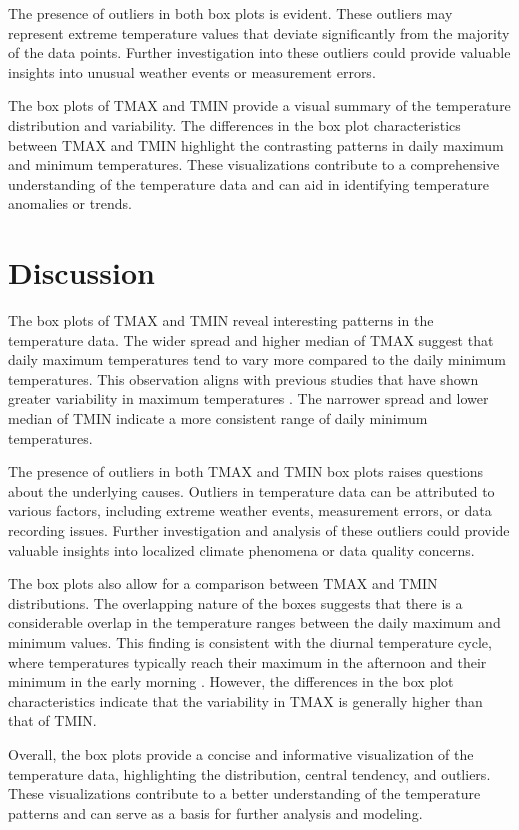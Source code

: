 \documentclass{article}
\begin{document}
The presence of outliers in both box plots is evident. These outliers may represent extreme temperature values that deviate significantly from the majority of the data points. Further investigation into these outliers could provide valuable insights into unusual weather events or measurement errors.

The box plots of TMAX and TMIN provide a visual summary of the temperature distribution and variability. The differences in the box plot characteristics between TMAX and TMIN highlight the contrasting patterns in daily maximum and minimum temperatures. These visualizations contribute to a comprehensive understanding of the temperature data and can aid in identifying temperature anomalies or trends.

\section{Discussion}

The box plots of TMAX and TMIN reveal interesting patterns in the temperature data. The wider spread and higher median of TMAX suggest that daily maximum temperatures tend to vary more compared to the daily minimum temperatures. This observation aligns with previous studies that have shown greater variability in maximum temperatures \cite{meehl2004more}. The narrower spread and lower median of TMIN indicate a more consistent range of daily minimum temperatures.

The presence of outliers in both TMAX and TMIN box plots raises questions about the underlying causes. Outliers in temperature data can be attributed to various factors, including extreme weather events, measurement errors, or data recording issues. Further investigation and analysis of these outliers could provide valuable insights into localized climate phenomena or data quality concerns.

The box plots also allow for a comparison between TMAX and TMIN distributions. The overlapping nature of the boxes suggests that there is a considerable overlap in the temperature ranges between the daily maximum and minimum values. This finding is consistent with the diurnal temperature cycle, where temperatures typically reach their maximum in the afternoon and their minimum in the early morning \cite{gates1993diurnal}. However, the differences in the box plot characteristics indicate that the variability in TMAX is generally higher than that of TMIN.

Overall, the box plots provide a concise and informative visualization of the temperature data, highlighting the distribution, central tendency, and outliers. These visualizations contribute to a better understanding of the temperature patterns and can serve as a basis for further analysis and modeling.
\end{document}
